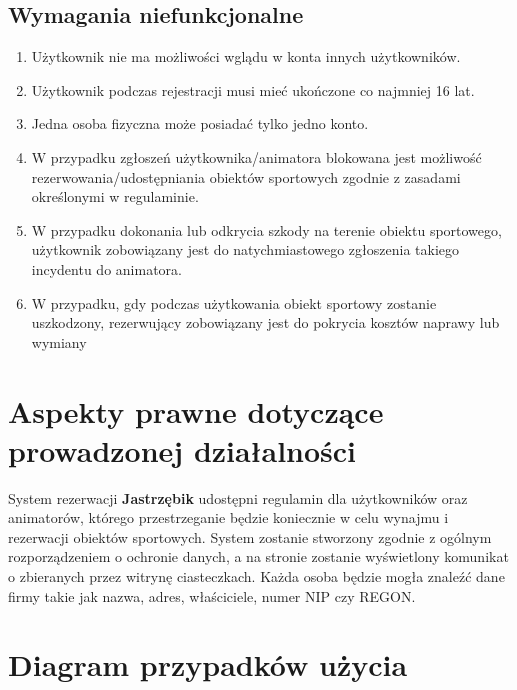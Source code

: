 \documentclass[a4paper,11pt]{article}
\begin{document}
    \subsection{Wymagania niefunkcjonalne}

        \begin{enumerate}
        	\item Użytkownik nie ma możliwości wglądu w konta innych użytkowników.
        	\item Użytkownik podczas rejestracji musi mieć ukończone co najmniej 16 lat.
        	\item Jedna osoba fizyczna może posiadać tylko jedno konto.
        	\item W przypadku zgłoszeń użytkownika/animatora blokowana jest możliwość rezerwowania/udostępniania obiektów sportowych zgodnie z zasadami określonymi w regulaminie.
        	\item W przypadku dokonania lub odkrycia szkody na terenie obiektu sportowego, użytkownik zobowiązany jest do natychmiastowego zgłoszenia takiego incydentu do animatora.
        	\item W przypadku, gdy podczas użytkowania obiekt sportowy zostanie uszkodzony, rezerwujący zobowiązany jest do pokrycia kosztów naprawy lub wymiany
        \end{enumerate}

\section{Aspekty prawne dotyczące prowadzonej działalności}

    System rezerwacji \textbf{Jastrzębik} udostępni regulamin dla użytkowników oraz animatorów, którego przestrzeganie będzie koniecznie w celu wynajmu i rezerwacji obiektów sportowych. System zostanie stworzony zgodnie z ogólnym rozporządzeniem o ochronie danych, a na stronie zostanie wyświetlony komunikat o zbieranych przez witrynę ciasteczkach. Każda osoba będzie mogła znaleźć dane firmy takie jak nazwa, adres, właściciele, numer NIP czy REGON.

\section{Diagram przypadków użycia}
\end{document}
